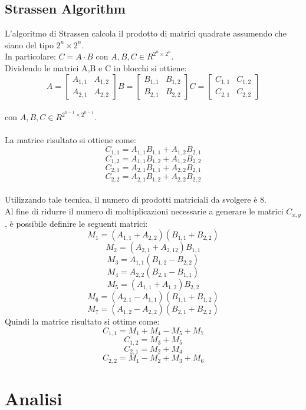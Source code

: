 \subsection{Strassen Algorithm}
L'algoritmo di Strassen calcola il prodotto di matrici quadrate assumendo che siano
del tipo $2^n \times 2^n$. \\ In particolare: $C=A \cdot B$ con $A,B,C \in R^{2^n \times 2^n}$.\\
Dividendo le matrici A,B e C in blocchi si ottiene:
\\
\[
A =
\begin{bmatrix}
  A_{1,1} & A_{1,2} \\
  A_{2,1} & A_{2,2}
\end{bmatrix}
B =
\begin{bmatrix}
  B_{1,1} & B_{1,2} \\
  B_{2,1} & B_{2,2}
\end{bmatrix}
C =
\begin{bmatrix}
  C_{1,1} & C_{1,2} \\
  C_{2,1} & C_{2,2}
\end{bmatrix}
\]\\
con $A, B, C \in R^{2^{n-1} \times 2^{n-1}}$.\\
\\
La matrice risultato si ottiene come:\\
$$C_{1,1} = A_{1,1}B_{1,1}+A_{1,2}B_{2,1}$$
$$C_{1,2} = A_{1,1}B_{1,2}+A_{1,2}B_{2,2}$$
$$C_{2,1} = A_{2,1}B_{1,1}+A_{2,2}B_{2,1}$$
$$C_{2,2} = A_{2,1}B_{1,2}+A_{2,2}B_{2,2}$$
\\
Utilizzando tale tecnica, il numero di prodotti matriciali da svolgere è 8.\\
Al fine di ridurre il numero di moltiplicazioni necessarie a generare le matrici
$C_{x,y}$, è possibile definire le seguenti
matrici:\\
$$M_1 = (A_{1,1}+A_{2,2})(B_{1,1}+B_{2,2})$$
$$M_2 = (A_{2,1}+A_{2,12})B_{1,1}$$
$$M_3 = A_{1,1}(B_{1,2}-B_{2,2})$$
$$M_4 = A_{2,2}(B_{2,1}-B_{1,1})$$
$$M_5 = (A_{1,1}+A_{1,2})B_{2,2}$$
$$M_6 = (A_{2,1}-A_{1,1})(B_{1,1}+B_{1,2})$$
$$M_7 = (A_{1,2}-A_{2,2})(B_{2,1}+B_{2,2})$$
Quindi la matrice risultato si ottime come:
$$C_{1,1} = M_1 + M_4 - M_5 + M_7$$
$$C_{1,2} = M_3 + M_5$$
$$C_{2,1} = M_2 + M_4$$
$$C_{2,2} = M_1 - M_2 + M_3 + M_6$$

\clearpage
\section{Analisi}

